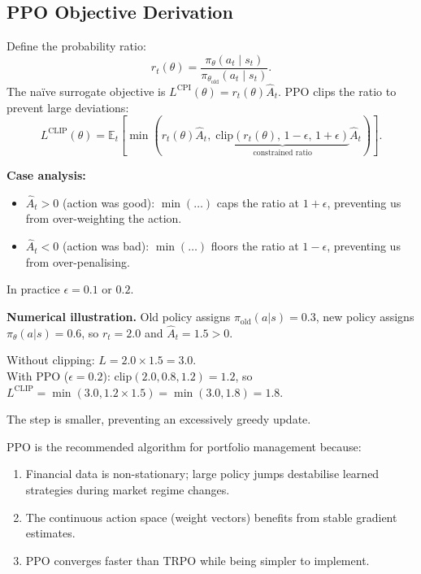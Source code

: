 \documentclass[12pt,a4paper]{article}
\begin{document}
\subsection{PPO Objective Derivation}

Define the probability ratio:
\begin{equation}
  r_t(\theta) = \frac{\pi_\theta(a_t \mid s_t)}{\pi_{\theta_{\text{old}}}(a_t \mid s_t)}.
\end{equation}
The na\"ive surrogate objective is $L^{\text{CPI}}(\theta) = r_t(\theta)\hat{A}_t$.
PPO clips the ratio to prevent large deviations:
\begin{equation}
  L^{\text{CLIP}}(\theta) = \mathbb{E}_t\!\left[
    \min\!\left(r_t(\theta)\hat{A}_t,\;
    \underbrace{\text{clip}(r_t(\theta),\, 1{-}\epsilon,\, 1{+}\epsilon)}_{\text{constrained ratio}}
    \hat{A}_t\right)
  \right].
  \label{eq:ppo}
\end{equation}

\textbf{Case analysis:}
\begin{itemize}[nosep]
  \item $\hat{A}_t > 0$ (action was good): $\min(\ldots)$ caps the ratio at
        $1+\epsilon$, preventing us from over-weighting the action.
  \item $\hat{A}_t < 0$ (action was bad): $\min(\ldots)$ floors the ratio at
        $1-\epsilon$, preventing us from over-penalising.
\end{itemize}
In practice $\epsilon = 0.1$ or $0.2$.

\begin{exbox}
\textbf{Numerical illustration.}
Old policy assigns $\pi_{\text{old}}(a|s) = 0.3$, new policy assigns
$\pi_\theta(a|s) = 0.6$, so $r_t = 2.0$ and $\hat{A}_t = 1.5 > 0$.

Without clipping: $L = 2.0 \times 1.5 = 3.0$.\\
With PPO ($\epsilon=0.2$): $\text{clip}(2.0, 0.8, 1.2) = 1.2$, so
$L^{\text{CLIP}} = \min(3.0, 1.2 \times 1.5) = \min(3.0, 1.8) = 1.8$.

The step is smaller, preventing an excessively greedy update.
\end{exbox}

\begin{finbox}
PPO is the recommended algorithm for portfolio management because:
\begin{enumerate}[nosep]
  \item Financial data is non-stationary; large policy jumps destabilise
        learned strategies during market regime changes.
  \item The continuous action space (weight vectors) benefits from stable
        gradient estimates.
  \item PPO converges faster than TRPO while being simpler to implement.
\end{enumerate}
\end{finbox}
\end{document}
